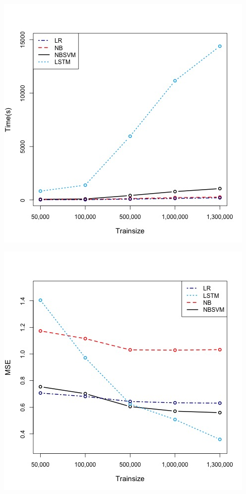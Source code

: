 \documentclass[letterpaper]{article} %
\begin{document}
\begin{center}
\centering
\includegraphics[width=\columnwidth]{../Plots/Compare_runtime.jpeg}
\label{fig:runtime}
\end{center}

\begin{center}
\centering
\includegraphics[width=\columnwidth]{../Plots/Compare_mse.jpeg}
\label{fig:mse}
\end{center}
\end{document}
